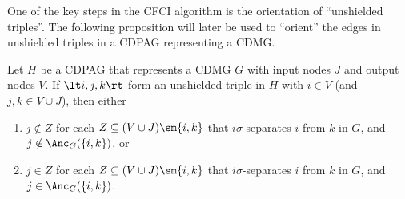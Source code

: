 One of the key steps in the CFCI algorithm is the orientation of ``unshielded triples''.
The following proposition will later be used to ``orient'' the edges in unshielded triples in a CDPAG representing a CDMG.
\begin{Prp}\label{prp:orienting_unshielded_triples}
  Let $H$ be a CDPAG that represents a CDMG $G$ with input nodes $J$ and output nodes $V$.
  If $\lt i, j, k \rt$ form an unshielded triple in $H$ with $i \in V$ (and $j,k \in V \cup J$), then either 
  \begin{enumerate}[label=(\roman*)]
    \item $j \notin Z$ for each $Z \subseteq (V \cup J) \sm \{i,k\}$ that $i\sigma$-separates $i$ from $k$ in $G$, and $j \notin \Anc_G(\{i,k\})$, or
    \item $j \in Z$ for each $Z \subseteq (V \cup J) \sm \{i,k\}$ that $i\sigma$-separates $i$ from $k$ in $G$, and $j \in \Anc_G(\{i,k\})$.
  \end{enumerate}
\end{Prp}

